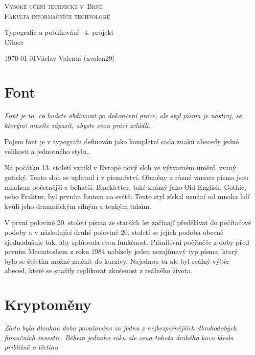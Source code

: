 \documentclass[a4paper, 11pt]{article}
\begin{document}
\begin{titlepage}
\begin{center}
\Huge\textsc{Vysoké učení technické v~Brně}\\
\huge\textsc{Fakulta informačních technologií}\\[0.4em]

\LARGE{Typografie a publikování\,--\,4. projekt}\\
\Huge{Citace}

\Large\today \hfill Václav Valenta (xvalen29)
\end{center} 
\end{titlepage}

\section*{Font}
\textit{Font je to, co budete obdivovat po dokončení práce, ale styl písma je nástroj, se kterými musíte zápasit, abyste svou práci zvládli.\cite{Felici:The_Complete_Manual_of_Typography}}
\bigskip

Pojem font je v typografii definován jako kompletní sada znaků abecedy jedné velikosti a jednotného stylu.\cite{wiki:Font}.\bigskip

Na počátku 13. století vznikl v Evropě nový sloh ve výtvarném umění, zvaný gotický. Tento sloh se uplatnil i v písmařství. Obměny a různé variace písma jsou mnohem početnější a bohatší. \cite{Miklova:Pismo_v_aranzerske_a_propagacnni_cinnosti}
Blackletter, také známý jako Old English, Gothic, nebo Fraktur, byl prvním fontem na světě. Tento styl získal uznání od mnoha lidí kvůli jeho dramatickým silným a tenkým tahům.\cite{Music_Mayhem:The_History_of_The_First_World_Font}

V první polovině 20. století písma ze starších let začínají předělávat do
počítačové podoby a v následující druhé polovině 20. století se jejich podoba obecně
zjednodušuje tak, aby splňovala svou funkčnost.\cite{Koprivova:Pismo_volny_soubor}
Primitivní počítačče z doby před prvním Macintoshem z roku 1984 nabízely jeden nezajímavý typ písma, který bylo se štěstím možné zménit do kurzivy. Najednou tu ale byl reálný výběr abeced, které se snažily replikovat zkušenost z reálného života.\cite{Garfield:Just_My_Type}

\bigskip
\bigskip


\section*{Kryptoměny}
\textit{Zlato bylo dlouhou dobu považováno za jednu z nejbezpečnějších dlouhodobých finančních investic. Během jednoho roku ale cena tohoto drahého kovu klesla přibližně o třetinu\cite{Muller:Poprask_kolem_Bitcoinu}}
\bigskip
\end{document}
